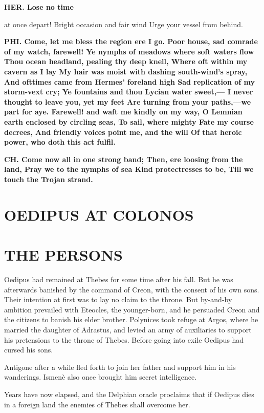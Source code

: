 \documentclass[11pt,letter]{book}
\begin{document}
\par \textbf{HER. Lose no time}
\par   at once depart! Bright occasion and fair wind Urge your vessel from behind.

\par \textbf{PHI. Come, let me bless the region ere I go. Poor house, sad comrade of my watch, farewell! Ye nymphs of meadows where soft waters flow Thou ocean headland, pealing thy deep knell, Where oft within my cavern as I lay My hair was moist with dashing south-wind’s spray, And ofttimes came from Hermes’ foreland high Sad replication of my storm-vext cry; Ye fountains and thou Lycian water sweet,— I never thought to leave you, yet my feet Are turning from your paths,—we part for aye. Farewell! and waft me kindly on my way, O Lemnian earth enclosed by circling seas, To sail, where mighty Fate my course decrees, And friendly voices point me, and the will Of that heroic power, who doth this act fulfil.}
\par 

\par \textbf{CH. Come now all in one strong band; Then, ere loosing from the land, Pray we to the nymphs of sea Kind protectresses to be, Till we touch the Trojan strand.}
\par 
\section{OEDIPUS AT COLONOS}\section{THE PERSONS} 
\par  [page 260] Oedipus had remained at Thebes for some time after his fall. But he was afterwards banished by the command of Creon, with the consent of his own sons. Their intention at first was to lay no claim to the throne. But by-and-by ambition prevailed with Eteocles, the younger-born, and he persuaded Creon and the citizens to banish his elder brother. Polynices took refuge at Argos, where he married the daughter of Adrastus, and levied an army of auxiliaries to support his pretensions to the throne of Thebes. Before going into exile Oedipus had cursed his sons.

\par  Antigone after a while fled forth to join her father and support him in his wanderings. Ismenè also once brought him secret intelligence.

\par  Years have now elapsed, and the Delphian oracle proclaims that if Oedipus dies in a foreign land the enemies of Thebes shall overcome her.
\end{document}
